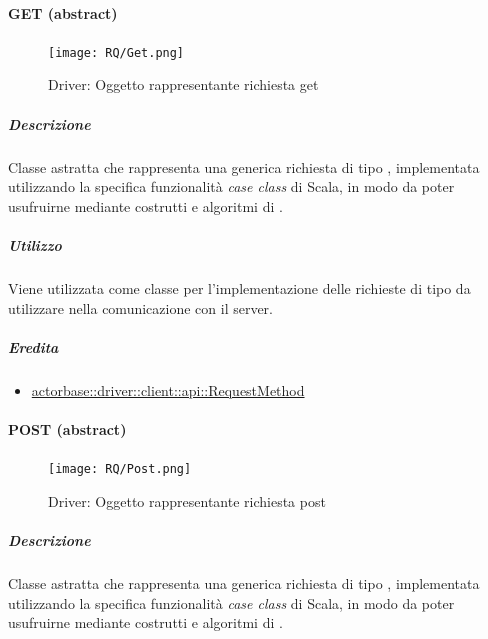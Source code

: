 \documentclass{scalatekids-article}
\begin{document}

\paragraph{GET (abstract)}
\label{sec:actorbase::driver::client::api::GET}

\begin{figure}[H]
  \begin{center}
    \texttt{[image: RQ/Get.png]}
    \caption{Driver: Oggetto rappresentante richiesta get}
  \end{center}
\end{figure}

\subparagraph{Descrizione}

Classe astratta che rappresenta una generica richiesta  di tipo
, implementata utilizzando la specifica funzionalità \textit{case
  class} di Scala, in modo da poter usufruirne mediante costrutti e algoritmi di
.

\subparagraph{Utilizzo}

Viene utilizzata come classe per l'implementazione delle richieste 
di tipo  da utilizzare nella comunicazione con il server.

\subparagraph{Eredita}

\begin{itemize}
\item \hyperref[sec:actorbase::driver::client::api::RequestMethod]{actorbase::driver::client::api::RequestMethod}
\end{itemize}


\paragraph{POST (abstract)}
\label{sec:actorbase::driver::client::api::POST}

\begin{figure}[H]
  \begin{center}
    \texttt{[image: RQ/Post.png]}
    \caption{Driver: Oggetto rappresentante richiesta post}
  \end{center}
\end{figure}

\subparagraph{Descrizione}

Classe astratta che rappresenta una generica richiesta  di tipo
, implementata utilizzando la specifica funzionalità \textit{case
  class} di Scala, in modo da poter usufruirne mediante costrutti e algoritmi di
.
\end{document}
